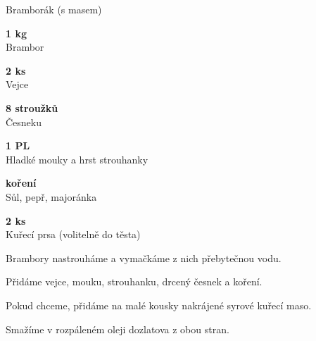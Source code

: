 \documentclass[11pt,a4paper]{article}
\begin{document}
\begin{recipe}[ForestGreen]{Bramborák (s masem)}
    \begin{ingredients}
        \item \parbox[t]{\linewidth}{\raggedright \weight \textbf{1 kg}\\ Brambor}
        \item \parbox[t]{\linewidth}{\raggedright \piece \textbf{2 ks}\\ Vejce}
        \item \parbox[t]{\linewidth}{\raggedright \piece \textbf{8 stroužků}\\ Česneku}
        \item \parbox[t]{\linewidth}{\raggedright \spoon \textbf{1 PL}\\ Hladké mouky a hrst strouhanky}
        \item \parbox[t]{\linewidth}{\raggedright \indefinite \textbf{koření}\\ Sůl, pepř, majoránka}
        \item \parbox[t]{\linewidth}{\raggedright \weight \textbf{2 ks}\\ Kuřecí prsa (volitelně do těsta)}
    \end{ingredients}
    \begin{steps}
        \item Brambory nastrouháme a vymačkáme z nich přebytečnou vodu.
        \item Přidáme vejce, mouku, strouhanku, drcený česnek a koření.
        \item Pokud chceme, přidáme na malé kousky nakrájené syrové kuřecí maso.
        \item Smažíme v rozpáleném oleji dozlatova z obou stran.
    \end{steps}
\end{recipe}
\end{document}
